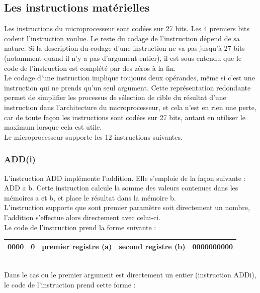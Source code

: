 \documentclass[a4paper, 12pt, twoside]{report}
\begin{document}
\subsection{Les instructions matérielles}

Les instructions du microprocesseur sont codées sur 27 bits. Les 4 premiers bits 
codent l'instruction voulue. Le reste du codage de l'instruction dépend de sa nature.
Si la description du codage d'une instruction ne va pas jusqu'à 27 bits (notamment
quand il n'y a pas d'argument entier), il est sous entendu que le code de 
l'instruction est complété par des zéros à la fin.\\

Le codage d'une instruction implique toujours deux opérandes, même si c'est une 
instruction qui ne prends qu'un seul argument. Cette représentation redondante permet 
de simplifier les processus de sélection de cible du résultat d'une instruction dans 
l'architecture du microprocesseur, et cela n'est en rien une perte, car de toute façon 
les instructions sont codées sur 27 bits, autant en utiliser le maximum lorsque cela est utile.\\

Le microprocesseur supporte les 12 instructions suivantes.\\

\subsubsection{ADD(i)}

L'instruction ADD implémente l'addition. Elle s'emploie de la façon suivante :
ADD a b. Cette instruction calcule la somme des valeurs contenues dans les mémoires
a et b, et place le résultat dans la mémoire b.\\
L'instruction supporte que sont premier paramètre soit directement un nombre, l'addition
s'effectue alors directement avec celui-ci.\\

Le code de l'instruction prend la forme suivante :

\begin{tabular}{|c|c|c|c|c|}
  \hline
  0000 & 0 & premier registre (a) & second registre (b) & 0000000000 \\
  \hline
\end{tabular}\\

Dans le cas ou le premier argument est directement un entier (instruction ADDi),
le code de l'instruction prend cette forme :
\end{document}
